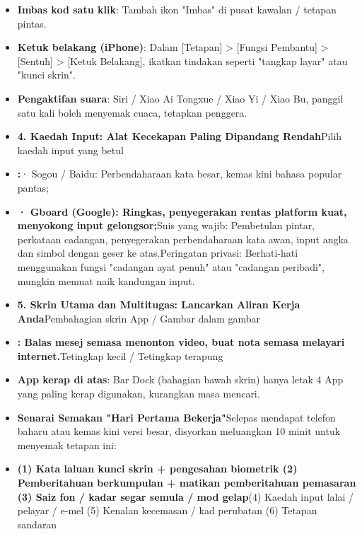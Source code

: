 
\begin{itemize}
  \item \textbf{Imbas kod satu klik}: Tambah ikon "Imbas" di pusat kawalan / tetapan pintas.
  \item \textbf{Ketuk belakang (iPhone)}: Dalam [Tetapan] > [Fungsi Pembantu] > [Sentuh] > [Ketuk Belakang], ikatkan tindakan seperti "tangkap layar" atau "kunci skrin".
  \item \textbf{Pengaktifan suara}: Siri / Xiao Ai Tongxue / Xiao Yi / Xiao Bu, panggil satu kali boleh menyemak cuaca, tetapkan penggera.
  \item \textbf{4. Kaedah Input: Alat Kecekapan Paling Dipandang Rendah}Pilih kaedah input yang betul
  \item \textbf{:}· Sogou / Baidu: Perbendaharaan kata besar, kemas kini bahasa popular pantas;
\end{itemize}


\begin{itemize}
  \item \textbf{· Gboard (Google): Ringkas, penyegerakan rentas platform kuat, menyokong input gelongsor;}\newline Suis yang wajib\newline : Pembetulan pintar, perkataan cadangan, penyegerakan perbendaharaan kata awan, input angka dan simbol dengan geser ke atas.\newline Peringatan privasi\newline : Berhati-hati menggunakan fungsi "cadangan ayat penuh" atau "cadangan peribadi", mungkin memuat naik kandungan input.
  \item \textbf{5. Skrin Utama dan Multitugas: Lancarkan Aliran Kerja Anda}Pembahagian skrin App / Gambar dalam gambar
  \item \textbf{: Balas mesej semasa menonton video, buat nota semasa melayari internet.}Tetingkap kecil / Tetingkap terapung
\end{itemize}


\begin{itemize}
  \item \textbf{App kerap di atas}: Bar Dock (bahagian bawah skrin) hanya letak 4 App yang paling kerap digunakan, kurangkan masa mencari.
  \item \textbf{Senarai Semakan "Hari Pertama Bekerja"}Selepas mendapat telefon baharu atau kemas kini versi besar, disyorkan meluangkan 10 minit untuk menyemak tetapan ini:
  \item \textbf{(1) Kata laluan kunci skrin + pengesahan biometrik (2) Pemberitahuan berkumpulan + matikan pemberitahuan pemasaran (3) Saiz fon / kadar segar semula / mod gelap}(4) Kaedah input lalai / pelayar / e-mel (5) Kenalan kecemasan / kad perubatan (6) Tetapan sandaran
\end{itemize}

